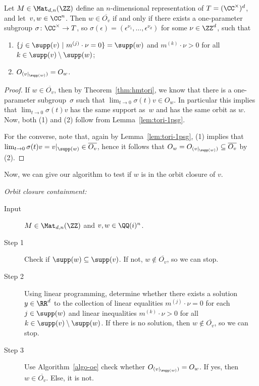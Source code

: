 \begin{lemma} \label{lem:tori-occ-justify}
Let $M \in\Mat_{d,n}(\ZZ)$ define an $n$-dimensional representation of $T = (\CC^\times)^d$, and let~$v,w \in \CC^n$.
Then $w \in \overline{O_v}$ if and only if there exists a one-parameter subgroup $\sigma\colon \CC^\times \to T$, so $\sigma(\epsilon) = (\epsilon^{\nu_1},\dots,\epsilon^{\nu_d})$ for some $\nu\in\ZZ^d$, such that
\begin{enumerate}
\item $ \{j \in \supp(v) \ | \ m^{(j)} \cdot \nu =  0\} = \supp(w)$ and $m^{(k)} \cdot \nu > 0$ for all $k \in \supp(v) \setminus \supp(w)$;
\item $O_{(v|_{\supp(w)})} = O_w$.
\end{enumerate}
\end{lemma}

\begin{proof}
If $w \in \overline{O_v}$, then by Theorem~\ref{thm:hmtori}, we know that there is a one-parameter subgroup~$\sigma$ such that $\lim_{t \to 0} \sigma(t) v \in O_w$.
In particular this implies that $\lim_{t \to 0} \sigma(t) v$ has the same support as~$w$ and has the same orbit as $w$.
Now, both (1) and (2) follow from Lemma~\ref{lem:tori-1psg}.

For the converse, note that, again by Lemma~\ref{lem:tori-1psg}, (1) implies that $\lim_{t \to 0} \sigma(t) v = v|_{\supp(w)} \in \overline{O_v}$, hence it follows that $O_w = O_{(v|_{\supp(w)})} \subseteq \overline{O_v}$ by (2).
\end{proof}

Now, we can give our algorithm to test if $w$ is in the orbit closure of $v$.

\begin{algorithm} \label{algo:occ} \emph{Orbit closure containment:}
\begin{description}
\item[Input]  $M \in \Mat_{d,n}(\ZZ)$ and $v,w \in \QQ(i)^n$.
\item[Step 1] Check if $\supp(w) \subseteq \supp(v)$. If not, $w \notin \overline{O_v}$, so we can stop.
\item[Step 2]  Using linear programming, determine whether there exists a solution $y\in\RR^d$ to the collection of linear equalities $m^{(j)} \cdot \nu = 0$ for each $j \in \supp(w)$ and linear inequalities $m^{(k)} \cdot \nu > 0$ for all $k \in \supp(v) \setminus \supp(w)$.
If there is no solution, then $w \notin \overline{O_v}$, so we can stop.
\item[Step 3]  Use Algorithm~\ref{algo-oe} check whether $O_{(v|_{\supp(w)})} = O_w$. If yes, then $w \in \overline{O_v}$. Else, it is not.
\end{description}
\end{algorithm}

